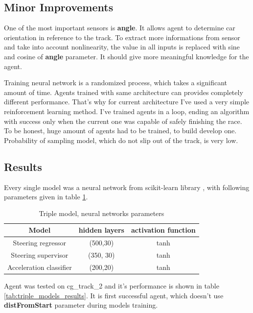 \documentclass[declaration,shortabstract,english,inz]{iithesis}
\begin{document}
\subsection{Minor Improvements}
One of the most important sensors is \textbf{angle}.
It allows agent to determine car orientation in reference to the track.
To extract more informations from sensor and take into account nonlinearity, the value in all inputs is replaced with sine and cosine of \textbf{angle} parameter.
It should give more meaningful knowledge for the agent.



Training neural network is a randomized process, which takes a significant amount of time.
Agents trained with same architecture can provides completely different performance.
That's why for current architecture I've used a very simple reinforcement learning method.
I've trained agents in a loop, ending an algorithm with success only when the current one was capable of safely finishing the race.
To be honest, huge amount of agents had to be trained, to build develop one.
Probability of sampling model, which do not slip out of the track, is very low.



\subsection{Results}



Every single model was a neural network from scikit-learn library \cite{scikit_learn}, with following parameters given in table \ref{tab:triple_models_nn_params}.

\begin{table}[h]
    \centering
    \begin{tabular}{ |c|c|c|}
          \hline
          Model & hidden layers & activation function \\
          \hline
          Steering regressor & (500,30) &  tanh  \\
          \hline
          Steering supervisor &  (350, 30) & tanh \\
          \hline
          Acceleration classifier & (200,20) & tanh \\
          \hline
        \end{tabular}
        \caption{Triple model, neural networks parameters}
        \label{tab:triple_models_nn_params}
\end{table}

Agent was tested on cg\_track\_2 and it's performance is shown in table \ref{tab:triple_models_results}.
It is first successful agent, which doesn't use \textbf{distFromStart} parameter during models training.
\end{document}
